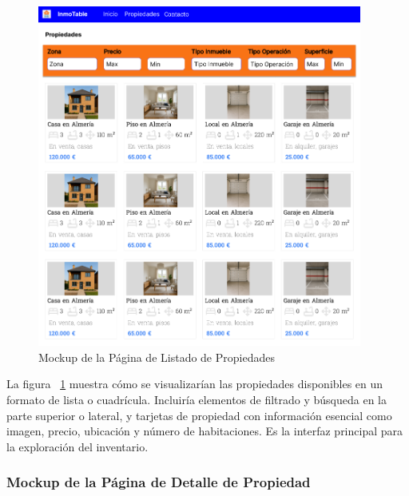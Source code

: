 \begin{figure}[H]
    \begin{center}
        \includegraphics[width = 0.95\textwidth]{Figuras/mockup_2_listado_propiedades.png}
    \end{center}
    \caption{\label{fig:mockup_2_listado_propiedades} Mockup de la Página de Listado de Propiedades}
\end{figure}

La figura ~\ref{fig:mockup_2_listado_propiedades} muestra cómo se visualizarían las propiedades disponibles en un formato de lista o cuadrícula. Incluiría elementos de filtrado y búsqueda en la parte superior o lateral, y tarjetas de propiedad con información esencial como imagen, precio, ubicación y número de habitaciones. Es la interfaz principal para la exploración del inventario.

\subsubsection{Mockup de la Página de Detalle de Propiedad}


